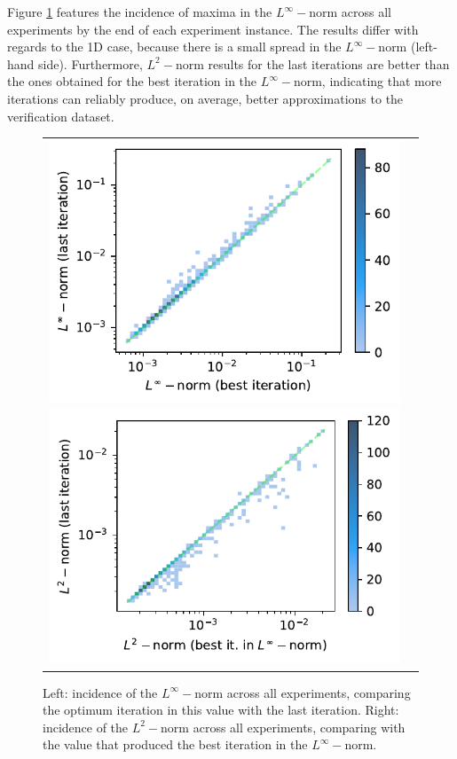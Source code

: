 \documentclass[12pt]{report} %
\begin{document}
Figure \ref{fig:parabola-results-incidence-l-norms} features the incidence of maxima in the $L^\infty-$norm across all experiments by the end of each experiment instance. The results differ with regards to the 1D case, because there is a small spread in the $L^\infty-$norm (left-hand side). Furthermore, $L^2-$norm results for the last iterations are better than the ones obtained for the best iteration in the $L^\infty-$norm, indicating that more iterations can reliably produce, on average, better approximations to the verification dataset.

\begin{figure}[h]
  \hspace*{-2cm}
  \begin{tabular}{cc}
    \includegraphics[width=.6\textwidth]{imagenes/experiments/2d/statistical_2d_full_scheduler_interpolation/parabola/incidence_of_linf.pdf}
  \includegraphics[width=.6\textwidth]{imagenes/experiments/2d/statistical_2d_full_scheduler_interpolation/parabola/incidence_of_l2.pdf}
  \end{tabular}
  \caption{Left: incidence of the $L^\infty-$norm across all experiments, comparing the optimum iteration in this value with the last iteration. Right: incidence of the $L^2-$norm across all experiments, comparing with the value that produced the best iteration in the $L^\infty-$norm.}
  \label{fig:parabola-results-incidence-l-norms}
\end{figure}
\end{document}
